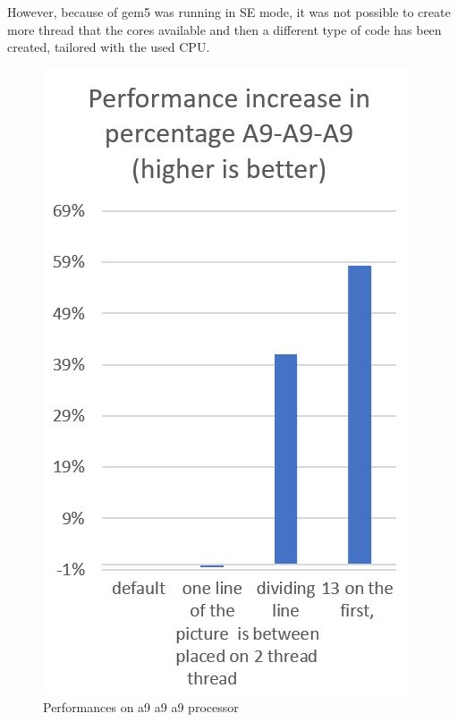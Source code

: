 \documentclass[journal]{IEEEtran}
\begin{document}
However, because of gem5 was running in SE mode, it was not possible to create more thread that the cores available and then a different type of code has been created, tailored with the used CPU.

\begin{figure}[!h]
	\centering
	\includegraphics[width=.8\linewidth]{a9a9a9}
	\caption{Performances on a9 a9 a9 processor}
	\label{fig:a9a9a9}
\end{figure}
\end{document}
